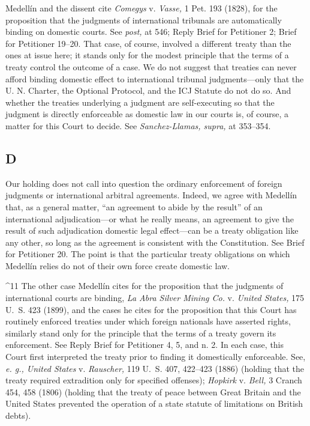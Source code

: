 {  Medellín and the dissent cite \emph{Comegys} v. \emph{Vasse,} 1 Pet.
193 (1828), for the proposition that the judgments of international
tribunals are automatically binding on domestic courts. See \emph{post,}
at 546; Reply Brief for Petitioner 2; Brief for Petitioner 19--20.
That case, of course, involved a different treaty than the ones at
issue here; it stands only for the modest principle that the terms of
a treaty control the outcome of a case. \footnotemark[11] We do not suggest that
treaties can never afford binding domestic effect to international
tribunal judgments---only that the U. N. Charter, the Optional Protocol,
and the ICJ Statute do not do so. And whether the treaties underlying a
judgment are self-executing so that the judgment is directly enforceable
as domestic law in our courts is, of course, a matter for this Court to
decide. See \emph{Sanchez-Llamas, supra,} at 353--354.

\subsection{D}

  Our holding does not call into question the ordinary enforcement of
foreign judgments or international arbitral \newpage  agreements. Indeed,
we agree with Medellín that, as a general matter, ``an agreement to
abide by the result'' of an international adjudication---or what he
really means, an agreement to give the result of such adjudication
domestic legal effect---can be a treaty obligation like any other, so
long as the agreement is consistent with the Constitution. See Brief
for Petitioner 20. The point is that the particular treaty obligations
on which Medellín relies do not of their own force create domestic law.

^11 The other case Medellín cites for the proposition that the
judgments of international courts are binding, \emph{La Abra Silver
Mining Co.} v. \emph{United States,} 175 U.~S. 423 (1899), and the
cases he cites for the proposition that this Court has routinely
enforced treaties under which foreign nationals have asserted rights,
similarly stand only for the principle that the terms of a treaty
govern its enforcement. See Reply Brief for Petitioner 4, 5, and n.
2. In each case, this Court first interpreted the treaty prior to
finding it domestically enforceable. See, \emph{e. g., United States}
v. \emph{Rauscher,} 119 U.~S. 407, 422--423 (1886) (holding that the
treaty required extradition only for specified offenses); \emph{Hopkirk}
v. \emph{Bell,} 3 Cranch 454, 458 (1806) (holding that the treaty of peace
between Great Britain and the United States prevented the operation of a
state statute of limitations on British debts).

}
